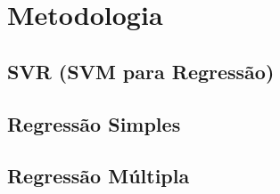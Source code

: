 \chapter{Metodologia}

\section{SVR (SVM para Regressão)}

\section{Regressão Simples}

\section{Regressão Múltipla}
